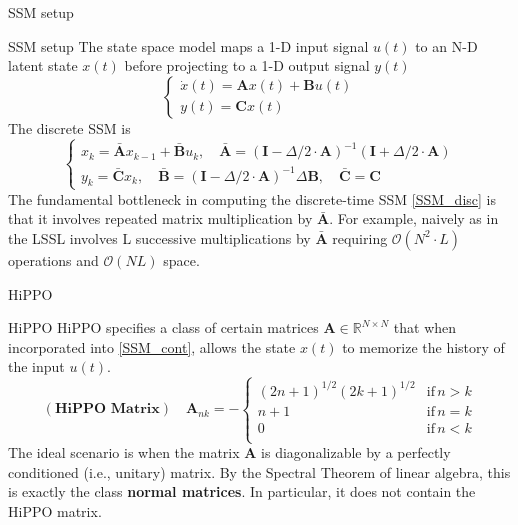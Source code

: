 \documentclass{beamer}
\begin{document}
\begin{frame}{SSM setup}
    \begin{block}{SSM setup}
        The state space model maps a 1-D input signal $u(t)$ to an N-D latent state $x(t)$ before projecting to a 1-D output signal $y(t)$
        \begin{equation}\label{SSM_cont}
            \begin{cases}
                \Dot{x}(t) = \mathbf{A}x(t) + \mathbf{B}u(t) \\
                y(t) = \mathbf{C}x(t)
            \end{cases}
        \end{equation}
        The discrete SSM is
        \begin{equation}\label{SSM_disc}
            \begin{cases}
                x_k = \bar{\mathbf{A}}x_{k-1} + \bar{\mathbf{B}}u_k, \quad  \bar{\mathbf{A}} = (\mathbf{I} - \Delta / 2\cdot \mathbf{A})^{-1}(\mathbf{I} + \Delta / 2\cdot \mathbf{A}) \\
                y_k = \bar{\mathbf{C}}x_{k}, \quad \bar{\mathbf{B}} = (\mathbf{I} - \Delta / 2\cdot \mathbf{A})^{-1}\Delta\mathbf{B}, \quad \bar{\mathbf{C}} = \mathbf{C}
            \end{cases}
        \end{equation}
        The fundamental bottleneck in computing the discrete-time SSM \eqref{SSM_disc} is that it involves repeated matrix multiplication by $\bar{\mathbf{A}}$. For example, naively as in the LSSL involves L successive multiplications
        by $\bar{\mathbf{A}}$ requiring $\mathcal{O}(N^2\cdot L)$ operations and $\mathcal{O}(NL)$ space. 
    \end{block}
\end{frame}

\begin{frame}{HiPPO}
    \begin{block}{HiPPO}
        HiPPO specifies a class of certain matrices $\mathbf{A} \in \mathbb{R}^{N\times N}$ that when incorporated into \eqref{SSM_cont}, allows the state $x(t)$ to memorize the history of the input $u(t)$.
        \begin{equation}\label{HiPPO}
            (\textbf{HiPPO Matrix}) \quad \mathbf{A}_{nk} = - \begin{cases}
                (2n+1)^{1/2}(2k+1)^{1/2} & \text{if}\, n > k \\
                n + 1 & \text{if}\, n = k \\
                0 & \text{if}\, n < k \\
            \end{cases}
        \end{equation}
        The ideal scenario is when the matrix $\mathbf{A}$ is diagonalizable by a perfectly conditioned (i.e., unitary) matrix. By the Spectral Theorem of linear algebra, this is exactly the class \textbf{normal matrices}. In particular, it does not contain the HiPPO matrix.
    \end{block}
\end{frame}
\end{document}
